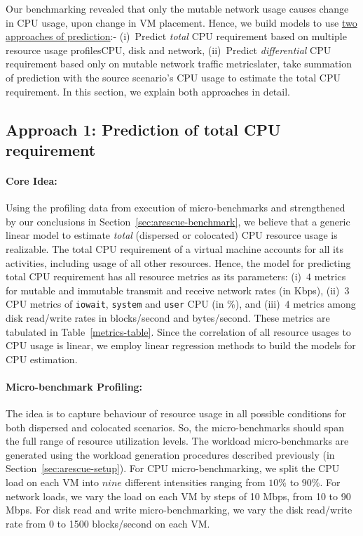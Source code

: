 Our benchmarking revealed that only the mutable network usage
causes change in CPU usage, upon change in VM placement.
Hence, we build models to use \underline{two approaches of prediction}:-
(i)~Predict \textit{total} CPU requirement based on multiple
resource usage profiles\textemdash{}CPU, disk and network,
(ii)~Predict \textit{differential} CPU requirement based only on
mutable network traffic metrics\textemdash{}later, take summation
of prediction with the source scenario's CPU usage to estimate
the total CPU requirement.
In this section, we explain both approaches in detail.

\subsection{Approach 1: Prediction of total CPU requirement}

\paragraph{Core Idea: } Using the profiling data from 
execution of micro-benchmarks and strengthened
by our conclusions in Section~\ref{sec:arescue-benchmark}, we 
believe that a generic linear model to estimate 
\textit{total} (dispersed or colocated) CPU resource usage
is realizable. 
The total CPU requirement of a virtual machine accounts for all its
activities, including usage of all other resources. Hence, the model
for predicting total CPU requirement has all resource metrics as its
parameters: (i)~$4$ metrics for mutable and
immutable transmit and receive network rates (in Kbps),
(ii)~$3$ CPU metrics of \texttt{iowait}, \texttt{system}
and \texttt{user} CPU (in \%), and
(iii)~$4$ metrics among disk read/write rates in
blocks/second and bytes/second. These metrics are
tabulated in Table~\ref{metrics-table}.
Since the correlation of all resource usages to CPU usage is linear, we employ
linear regression methods to build the models for CPU estimation.

\paragraph{Micro-benchmark Profiling: } The idea is to capture 
behaviour of resource usage in all possible conditions
for both dispersed and colocated scenarios. So, the micro-benchmarks
should span the full range of resource utilization levels. 
The workload micro-benchmarks are generated using the workload
generation procedures described previously (in 
Section~\ref{sec:arescue-setup}). 
For CPU micro-benchmarking, we split the CPU load on each VM
into $nine$ different intensities
ranging from $10\%$ to $90\%$. 
For network loads, we vary the load on each VM by steps 
of 10 Mbps, from 10 to 90 Mbps.
For disk read and write
micro-benchmarking, we vary the disk read/write rate from 
0 to 1500 blocks/second on each VM.

